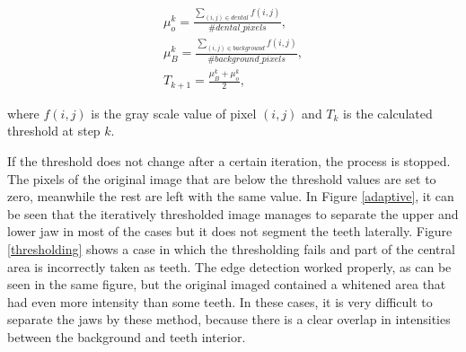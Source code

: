 \documentclass[a4paper,11pt,twoside]{article}
\begin{document}
\begin{gather}
\mu_o^k = \frac{\sum_{(i,j)\in dental} f(i,j)}{\#dental\_pixels},\\
\mu_B^k = \frac{\sum_{(i,j)\in background} f(i,j)}{\#background\_pixels},\\
T_{k+1} = \frac{\mu_B^k + \mu_o^k}{2},
\end{gather}

\noindent
where $f(i,j)$ is the gray scale value of pixel $(i,j)$ and $T_k$ is the calculated threshold at step $k$.

If the threshold does not change after a certain iteration, the process is stopped. The pixels of the original image that are below the threshold values are set to zero, meanwhile the rest are left with the same value. In Figure \ref{adaptive}, it can be seen that the iteratively thresholded image manages to separate the upper and lower jaw in most of the cases but it does not segment the teeth laterally. Figure \ref{thresholding} shows a case in which the thresholding fails and part of the central area is incorrectly taken as teeth. The edge detection worked properly, as can be seen in the same figure, but the original imaged contained a whitened area that had even more intensity than some teeth. In these cases, it is very difficult to separate the jaws by these method, because there is a clear overlap in intensities between the background and teeth interior.
\end{document}
